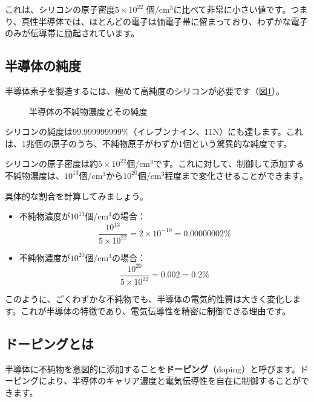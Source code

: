 これは、シリコンの原子密度$5 \times 10^{22}$ 個/cm$^3$に比べて非常に小さい値です。つまり、真性半導体では、ほとんどの電子は価電子帯に留まっており、わずかな電子のみが伝導帯に励起されています。

\subsection{半導体の純度}

半導体素子を製造するには、極めて高純度のシリコンが必要です（図\ref{fig:impurity}）。

\begin{figure}[H]
\centering
{}
\caption{半導体の不純物濃度とその純度}
\label{fig:impurity}
\end{figure}

シリコンの純度は99.999999999\%（イレブンナイン、11N）にも達します。これは、1兆個の原子のうち、不純物原子がわずか1個という驚異的な純度です。

シリコンの原子密度は約$5 \times 10^{22}$個/cm$^3$です。これに対して、制御して添加する不純物濃度は、$10^{13}$個/cm$^3$から$10^{20}$個/cm$^3$程度まで変化させることができます。

具体的な割合を計算してみましょう。

\begin{itemize}
\item 不純物濃度が$10^{13}$個/cm$^3$の場合：
\begin{equation}
\frac{10^{13}}{5 \times 10^{22}} = 2 \times 10^{-10} = 0.00000002\%
\end{equation}

\item 不純物濃度が$10^{20}$個/cm$^3$の場合：
\begin{equation}
\frac{10^{20}}{5 \times 10^{22}} = 0.002 = 0.2\%
\end{equation}
\end{itemize}

このように、ごくわずかな不純物でも、半導体の電気的性質は大きく変化します。これが半導体の特徴であり、電気伝導性を精密に制御できる理由です。

\subsection{ドーピングとは}

半導体に不純物を意図的に添加することを\textbf{ドーピング}（doping）と呼びます。ドーピングにより、半導体のキャリア濃度と電気伝導性を自在に制御することができます。

